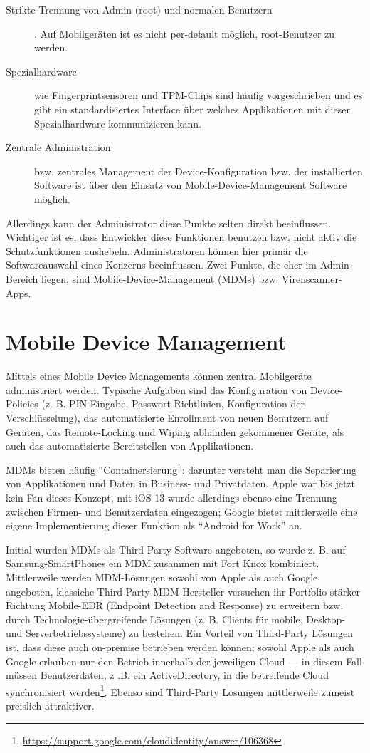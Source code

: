 \begin{description}
	\item[Strikte Trennung von Admin (root) und normalen Benutzern]. Auf Mobilgeräten ist es nicht per-default möglich, root-Benutzer zu werden.
	\item [Spezialhardware] wie Fingerprintsensoren und TPM-Chips sind häufig vorgeschrieben und es gibt ein standardisiertes Interface über welches Applikationen mit dieser Spezialhardware kommunizieren kann.
	\item [Zentrale Administration] bzw. zentrales Management der Device-Konfiguration bzw. der installierten Software ist über den Einsatz von Mobile-Device-Management Software möglich.
\end{description}

Allerdings kann der Administrator diese Punkte selten direkt beeinflussen. Wichtiger ist es, dass Entwickler diese Funktionen benutzen bzw. nicht aktiv die Schutzfunktionen aushebeln. Administratoren können hier primär die Softwareauswahl eines Konzerns beeinflussen. Zwei Punkte, die eher im Admin-Bereich liegen, sind Mobile-Device-Management (MDMs) bzw. Virenscanner-Apps.

\chapter{Mobile Device Management}

Mittels eines Mobile Device Managements können  zentral Mobilgeräte administriert werden. Typische Aufgaben sind das Konfiguration von Device-Policies (z. B. PIN-Eingabe, Passwort-Richtlinien, Konfiguration der Verschlüsselung), das automatisierte Enrollment von neuen Benutzern auf Geräten, das Remote-Locking und Wiping abhanden gekommener Geräte, als auch das automatisierte Bereitstellen von Applikationen.

MDMs bieten häufig ``Containersierung'': darunter versteht man die Separierung von Applikationen und Daten in Business- und Privatdaten. Apple war bis jetzt kein Fan dieses Konzept, mit iOS 13 wurde allerdings ebenso eine Trennung zwischen Firmen- und Benutzerdaten eingezogen; Google bietet mittlerweile eine eigene Implementierung dieser Funktion als ``Android for Work'' an.

Initial wurden MDMs als Third-Party-Software angeboten, so wurde z. B. auf Samsung-SmartPhones ein MDM zusammen mit Fort Knox kombiniert. Mittlerweile werden MDM-Lösungen sowohl von Apple als auch Google angeboten, klassiche Third-Party-MDM-Hersteller versuchen ihr Portfolio stärker Richtung Mobile-EDR (Endpoint Detection and Response) zu erweitern bzw. durch Technologie-übergreifende Lösungen (z. B. Clients für mobile, Desktop- und Serverbetriebssysteme) zu bestehen. Ein Vorteil von Third-Party Lösungen ist, dass diese auch on-premise betrieben werden können; sowohl Apple als auch Google erlauben nur den Betrieb innerhalb der jeweiligen Cloud --- in diesem Fall müssen Benutzerdaten, z .B. ein ActiveDirectory, in die betreffende Cloud synchronisiert werden\footnote{\url{https://support.google.com/cloudidentity/answer/106368}}. Ebenso sind Third-Party Lösungen mittlerweile zumeist preislich attraktiver.

